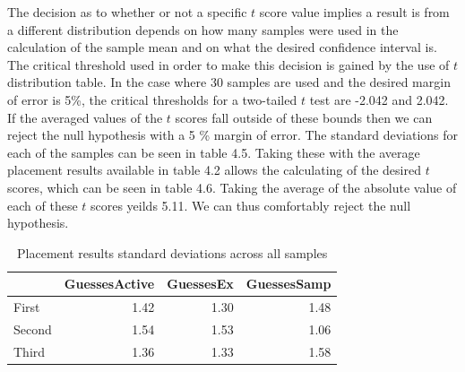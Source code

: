 The decision as to whether or not a specific $t$ score value implies a result
is from a different distribution depends on how many samples were used in the
calculation of the sample mean and on what the desired confidence interval is.
The critical threshold used in order to make this decision is gained by the use
of $t$ distribution table. In the case where 30 samples are used and the desired
margin of error is 5\%, the critical thresholds for a two-tailed $t$ test are
-2.042 and 2.042. If the averaged values of the $t$ scores fall outside of
these bounds then we can reject the null hypothesis with a 5 \% margin of error.
The standard deviations for each of the samples can be seen in table 4.5. Taking
these with the average placement results available in table 4.2 allows the
calculating of the desired $t$ scores, which can be seen in table 4.6. Taking
the average of the absolute value of each of these $t$ scores
yeilds 5.11. We can thus comfortably reject the null hypothesis.


\begin{table}
\begin{tabular}{lrrr}
\toprule
{} &  GuessesActive &  GuessesEx &  GuessesSamp \\
\midrule
First  &           1.42 &       1.30 &     1.48 \\
Second &           1.54 &       1.53 &     1.06 \\
Third  &           1.36 &       1.33 &     1.58 \\
\bottomrule
\end{tabular}
\caption{Placement results standard deviations across all samples}
\end{table}


